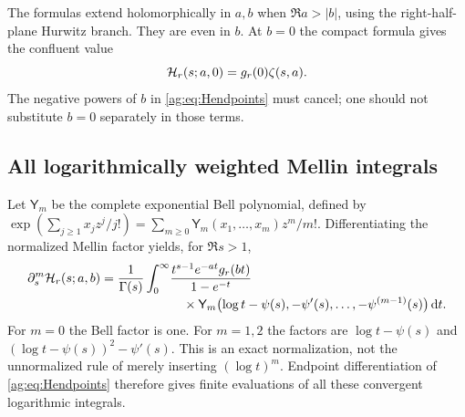 The formulas extend holomorphically in $a,b$ when $\Re a>|b|$, using
the right-half-plane Hurwitz branch. They are even in $b$. At $b=0$
the compact formula gives the confluent value
\begin{equation}\label{ag:eq:Hcollision}
 \mathcal H_r(s;a,0)=g_r(0)\zeta(s,a).
\end{equation}
The negative powers of $b$ in \eqref{ag:eq:Hendpoints} must cancel;
one should not substitute $b=0$ separately in those terms.

\subsection{All logarithmically weighted Mellin integrals}
Let $\mathsf Y_m$ be the complete exponential Bell polynomial, defined
by $\exp(\sum_{j\ge1}x_jz^j/j!)=\sum_{m\ge0}\mathsf Y_m(x_1,\ldots,x_m)z^m/m!$.
Differentiating the normalized Mellin factor yields, for $\Re s>1$,
\begin{align}
 \partial_s^m\mathcal H_r(s;a,b)
 =\frac1{\Gamma(s)}\int_0^\infty&
 \frac{t^{s-1}e^{-at}g_r(bt)}{1-e^{-t}}\notag\\[-2pt]
 &\quad\times\mathsf Y_m\bigl(\log t-\psi(s),-\psi'(s),
                      \ldots,-\psi^{(m-1)}(s)\bigr)\,\mathrm d t.
 \label{ag:eq:log-Mellin}
\end{align}
For $m=0$ the Bell factor is one. For $m=1,2$ the factors are
$\log t-\psi(s)$ and $(\log t-\psi(s))^2-\psi'(s)$.
This is an exact normalization, not the unnormalized rule of merely
inserting $(\log t)^m$. Endpoint differentiation of
\eqref{ag:eq:Hendpoints} therefore gives finite evaluations of all
these convergent logarithmic integrals.

